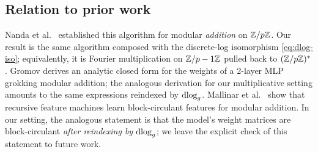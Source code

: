 \FloatBarrier
\subsection{Relation to prior work}
\label{subsec:relation}

Nanda et al.\ \cite{nanda2023progress} established this algorithm for modular
\emph{addition} on $\mathbb{Z}/p\mathbb{Z}$.  Our result is the same algorithm composed with
the discrete-log isomorphism \eqref{eq:dlog-iso}; equivalently, it is Fourier
multiplication on $\mathbb{Z}/p-1\mathbb{Z}$ pulled back to $(\mathbb{Z}/p\mathbb{Z})^*$.  Gromov
\cite{gromov2023grokking} derives an analytic closed form for the weights of a
2-layer MLP grokking modular addition; the analogous derivation for our
multiplicative setting amounts to the same expressions reindexed by $\operatorname{dlog}_g$.
Mallinar et al.\ \cite{mallinar2024emergence} show that recursive feature
machines learn block-circulant features for modular addition.  In our setting,
the analogous statement is that the model's weight matrices are block-circulant
\emph{after reindexing by $\operatorname{dlog}_g$}; we leave the explicit check of this
statement to future work.
